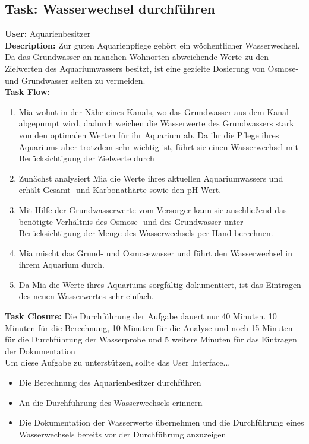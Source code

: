 \subsection{Task: Wasserwechsel durchführen}

\textbf{User:} Aquarienbesitzer\\

\textbf{Description:} Zur guten Aquarienpflege gehört ein wöchentlicher Wasserwechsel. Da das Grundwasser an manchen Wohnorten abweichende Werte zu den Zielwerten des Aquariumwassers besitzt, ist eine gezielte Dosierung von Osmose- und Grundwasser selten zu vermeiden.\\

\textbf{Task Flow:}
\begin{enumerate}
 \item Mia wohnt in der Nähe eines Kanals, wo das Grundwasser aus dem Kanal abgepumpt wird, dadurch weichen die Wasserwerte des Grundwassers stark von den optimalen Werten für ihr Aquarium ab. Da ihr die Pflege ihres Aquariums aber trotzdem sehr wichtig ist, führt sie einen Wasserwechsel mit Berücksichtigung der Zielwerte durch
 \item Zunächst analysiert Mia die Werte ihres aktuellen Aquariumwassers und erhält Gesamt- und Karbonathärte sowie den pH-Wert.
 \item Mit Hilfe der Grundwasserwerte vom Versorger kann sie anschließend das benötigte Verhältnis des Osmose- und des Grundwasser unter Berücksichtigung der Menge des Wasserwechsels per Hand berechnen.
 \item Mia mischt das Grund- und Osmosewasser und führt den Wasserwechsel in ihrem Aquarium durch.
 \item Da Mia die Werte ihres Aquariums sorgfältig dokumentiert, ist das Eintragen des neuen Wasserwertes sehr einfach.
\end{enumerate}

\textbf{Task Closure:} Die Durchführung der Aufgabe dauert nur 40 Minuten. 10 Minuten für die Berechnung, 10 Minuten für die Analyse und noch 15 Minuten für die Durchführung der Wasserprobe und 5 weitere Minuten für das Eintragen der Dokumentation\\

Um diese Aufgabe zu unterstützen, sollte das User Interface...
\begin{itemize}
  \item Die Berechnung des Aquarienbesitzer durchführen
  \item An die Durchführung des Wasserwechsels erinnern
  \item Die Dokumentation der Wasserwerte übernehmen und die Durchführung eines Wasserwechsels bereits vor der Durchführung anzuzeigen
\end{itemize}